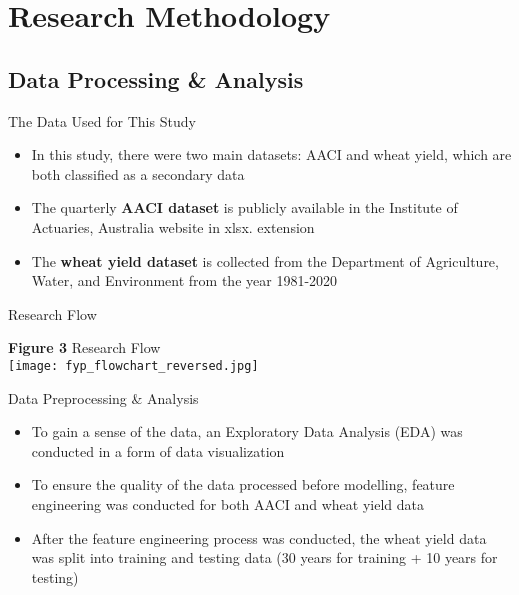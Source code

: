 \documentclass[aspectratio=169]{beamer}
\begin{document}
\section{Research Methodology}
\subsection{Data Processing \& Analysis}
\begin{frame}{The Data Used for This Study}
    \begin{itemize}
        \item  In this study, there were two main datasets: AACI and wheat yield, which are both classified as a secondary data
        \item The quarterly \textbf{AACI dataset} is publicly available in the Institute of Actuaries, Australia website in xlsx. extension
        \item The \textbf{wheat yield dataset} is collected from the Department of Agriculture, Water, and Environment from the year 1981-2020
    \end{itemize}
\end{frame}

\begin{frame}{Research Flow}
    \begin{center}
        \scriptsize{\textbf{Figure 3} Research Flow}\\
        \texttt{[image: fyp\_flowchart\_reversed.jpg]}
    \end{center}
\end{frame}

\begin{frame}{Data Preprocessing \& Analysis}
    \begin{itemize}
        \item To gain a sense of the data, an Exploratory Data Analysis (EDA) was conducted in a form of data visualization
        \item To ensure the quality of the data processed before modelling, feature engineering was conducted for both AACI and wheat yield data
        \item After the feature engineering process was conducted, the wheat yield data was split into training and testing data (30 years for training + 10 years for testing)
    \end{itemize}
\end{frame}
\end{document}
